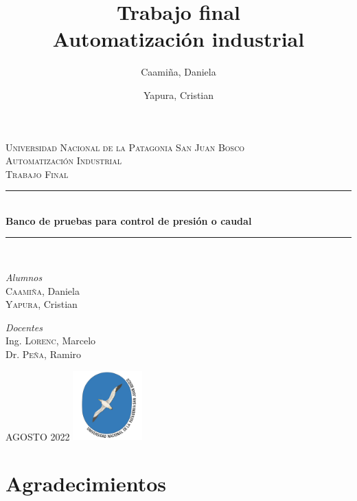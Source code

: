 \documentclass[12pt,a4paper]{article}
\date{}
\author{Caamiña, Daniela \and Yapura, Cristian}
\title{Trabajo final \\Automatización industrial}
\begin{document}
\begin{titlepage} %
	\newcommand{\HRule}{\rule{\linewidth}{0.5mm}}
	\center %
	\textsc{\LARGE Universidad Nacional de la Patagonia San Juan Bosco}\\[1.5cm]
	\textsc{\Large Automatización Industrial}\\[0.5cm]
	\textsc{\large Trabajo Final}\\[0.5cm]
	\HRule\\[0.4cm]
	\huge\bfseries{Banco de pruebas para control de presión o caudal}\\[0.2cm]
	\HRule\\[1.5cm]
	\begin{minipage}{0.4\textwidth}
		\begin{flushleft}
			\large
			\textit{Alumnos}\\
			\textsc{Caamiña,} Daniela \\
			\textsc{Yapura,} Cristian
		\end{flushleft}
	\end{minipage}
	\begin{minipage}{0.4\textwidth}
		\begin{flushright}
			\large
			\textit{Docentes}\\
			Ing. \textsc{Lorenc,} Marcelo \\
			Dr. \textsc{Peña,} Ramiro
		\end{flushright}
	\end{minipage}
	\vfill\vfill\vfill
	\large{AGOSTO 2022}
	\vfill\vfill
	\includegraphics[width=0.2\textwidth]{unpsjb.png}\\[1cm]
	\vfill
\end{titlepage}

\newpage
	


\section*{Agradecimientos}
\vspace{6cm}
\end{document}
